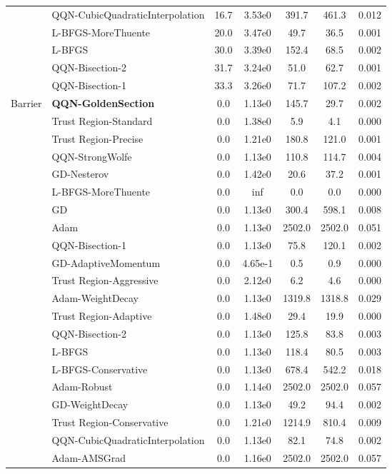 \documentclass{article}
\begin{document}
\begin{table}[htbp]
{\begin{tabular}{p{2.5cm}p{2.5cm}*{5}{c}}
 & QQN-CubicQuadraticInterpolation & 16.7 & 3.53e0 & 391.7 & 461.3 & 0.012 \\
 & L-BFGS-MoreThuente & 20.0 & 3.47e0 & 49.7 & 36.5 & 0.001 \\
 & L-BFGS & 30.0 & 3.39e0 & 152.4 & 68.5 & 0.002 \\
 & QQN-Bisection-2 & 31.7 & 3.24e0 & 51.0 & 62.7 & 0.001 \\
 & QQN-Bisection-1 & 33.3 & 3.26e0 & 71.7 & 107.2 & 0.002 \\
\midrule
\multirow{25}{*}{Barrier} & \textbf{QQN-GoldenSection} & 0.0 & 1.13e0 & 145.7 & 29.7 & 0.002 \\
 & Trust Region-Standard & 0.0 & 1.38e0 & 5.9 & 4.1 & 0.000 \\
 & Trust Region-Precise & 0.0 & 1.21e0 & 180.8 & 121.0 & 0.001 \\
 & QQN-StrongWolfe & 0.0 & 1.13e0 & 110.8 & 114.7 & 0.004 \\
 & GD-Nesterov & 0.0 & 1.42e0 & 20.6 & 37.2 & 0.001 \\
 & L-BFGS-MoreThuente & 0.0 & inf & 0.0 & 0.0 & 0.000 \\
 & GD & 0.0 & 1.13e0 & 300.4 & 598.1 & 0.008 \\
 & Adam & 0.0 & 1.13e0 & 2502.0 & 2502.0 & 0.051 \\
 & QQN-Bisection-1 & 0.0 & 1.13e0 & 75.8 & 120.1 & 0.002 \\
 & GD-AdaptiveMomentum & 0.0 & 4.65e-1 & 0.5 & 0.9 & 0.000 \\
 & Trust Region-Aggressive & 0.0 & 2.12e0 & 6.2 & 4.6 & 0.000 \\
 & Adam-WeightDecay & 0.0 & 1.13e0 & 1319.8 & 1318.8 & 0.029 \\
 & Trust Region-Adaptive & 0.0 & 1.48e0 & 29.4 & 19.9 & 0.000 \\
 & QQN-Bisection-2 & 0.0 & 1.13e0 & 125.8 & 83.8 & 0.003 \\
 & L-BFGS & 0.0 & 1.13e0 & 118.4 & 80.5 & 0.003 \\
 & L-BFGS-Conservative & 0.0 & 1.13e0 & 678.4 & 542.2 & 0.018 \\
 & Adam-Robust & 0.0 & 1.14e0 & 2502.0 & 2502.0 & 0.057 \\
 & GD-WeightDecay & 0.0 & 1.13e0 & 49.2 & 94.4 & 0.002 \\
 & Trust Region-Conservative & 0.0 & 1.21e0 & 1214.9 & 810.4 & 0.009 \\
 & QQN-CubicQuadraticInterpolation & 0.0 & 1.13e0 & 82.1 & 74.8 & 0.002 \\
 & Adam-AMSGrad & 0.0 & 1.16e0 & 2502.0 & 2502.0 & 0.057 \\

\end{tabular}}
\end{table}
\end{document}
